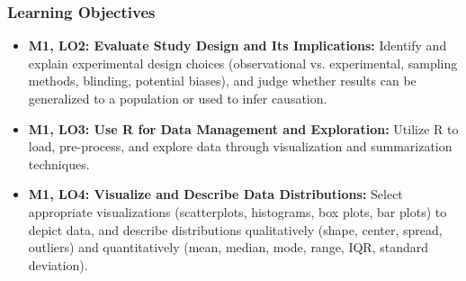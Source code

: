 \begin{frame}
    \frametitle{Learning Objectives}    
    \begin{itemize}
        \item \textbf{M1, LO2: Evaluate Study Design and Its Implications:} Identify and explain experimental design choices (observational vs. experimental, sampling methods, blinding, potential biases), and judge whether results can be generalized to a population or used to infer causation. 
        \item \textbf{M1, LO3: Use R for Data Management and Exploration:} Utilize R to load, pre-process, and explore data through visualization and summarization techniques.
        \item \textbf{M1, LO4: Visualize and Describe Data Distributions:} Select appropriate visualizations (scatterplots, histograms, box plots, bar plots) to depict data, and describe distributions qualitatively (shape, center, spread, outliers) and quantitatively (mean, median, mode, range, IQR, standard deviation).
    \end{itemize}
\end{frame}

